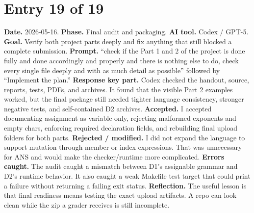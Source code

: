 \documentclass[11pt,a4paper]{article}
\begin{document}
\section*{Entry 19 of 19}
\textbf{Date.} 2026-05-16.
\textbf{Phase.} Final audit and packaging.
\textbf{AI tool.} Codex / GPT-5.
\textbf{Goal.} Verify both project parts deeply and fix anything that still blocked a complete submission.
\textbf{Prompt.} ``check if the Part 1 and 2 of the project is done fully and done accordingly and properly and there is nothing else to do, check every single file deeply and with as much detail as possible'' followed by ``Implement the plan.''
\textbf{Response key part.} Codex checked the handout, source, reports, tests, PDFs, and archives. It found that the visible Part 2 examples worked, but the final package still needed tighter language consistency, stronger negative tests, and self-contained D2 archives.
\textbf{Accepted.} I accepted documenting assignment as variable-only, rejecting malformed exponents and empty chars, enforcing required declaration fields, and rebuilding final upload folders for both parts.
\textbf{Rejected / modified.} I did not expand the language to support mutation through member or index expressions. That was unnecessary for ANS and would make the checker/runtime more complicated.
\textbf{Errors caught.} The audit caught a mismatch between D1's assignable grammar and D2's runtime behavior. It also caught a weak Makefile test target that could print a failure without returning a failing exit status.
\textbf{Reflection.} The useful lesson is that final readiness means testing the exact upload artifacts. A repo can look clean while the zip a grader receives is still incomplete.
\end{document}
